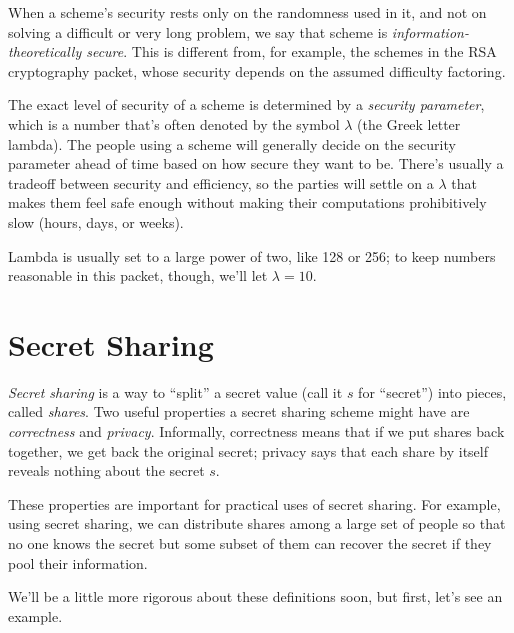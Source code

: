 \documentclass[12 pt]{article}
\newcounter{example}[section]
\begin{document}
When a scheme's security rests only on the randomness used in it, and not on 
solving a difficult or very long problem, we say that scheme is
\emph{information-theoretically secure}. This is different from, for example,
the schemes in the RSA cryptography packet, whose security depends on 
the assumed difficulty factoring\footnotemark.


The exact level of security of a scheme is determined by a \emph{security 
parameter}, which is a number that's often denoted by the symbol $\lambda$ 
(the Greek letter lambda). The people using a scheme will generally decide 
on the security parameter ahead of time based on how secure they want to 
be. There's usually a tradeoff between security and efficiency, so the 
parties will settle on a $\lambda$ that makes them feel safe enough without 
making their computations prohibitively slow (hours, days, or weeks).

Lambda is usually set to a large power of two, like 128 or 256; to keep 
numbers reasonable in this packet, though, we'll let $\lambda=10$.

\newpage
\section{Secret Sharing}\label{sec:ss}
\emph{Secret sharing} is a way to ``split'' a secret value (call it $s$ for 
``secret'') into pieces, called \emph{shares}. 
Two useful properties a secret sharing scheme might have are \emph{correctness} and 
\emph{privacy}. Informally, correctness means that if we put shares back together, 
we get back the original secret; privacy says that each share by itself reveals 
nothing about the secret $s$. 

These properties are important for practical uses of secret sharing. For 
example, using secret sharing, we can distribute shares among a large set of people so that no one 
knows the secret but some subset of them can recover the secret if they 
pool their information.

We'll be a little more rigorous about these definitions soon, but first, let's 
see an example.  
\end{document}
